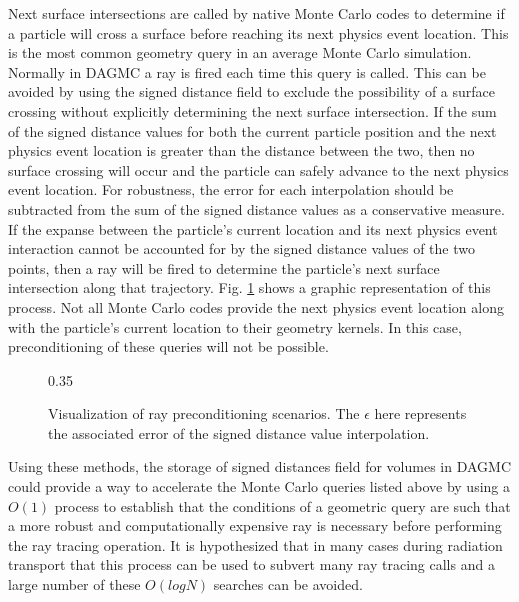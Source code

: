 Next surface intersections are called by native Monte Carlo codes to determine
if a particle will cross a surface before reaching its next physics event
location. This is the most common geometry query in an average Monte Carlo
simulation. Normally in DAGMC a ray is fired each time this query is
called. This can be avoided by using the signed distance field to exclude the
possibility of a surface crossing without explicitly determining the next
surface intersection. If the sum of the signed distance values for both the
current particle position and the next physics event location is greater than
the distance between the two, then no surface crossing will occur and the
particle can safely advance to the next physics event location. For robustness,
the error for each interpolation should be subtracted from the sum of the signed
distance values as a conservative measure. If the expanse between the particle's
current location and its next physics event interaction cannot be accounted for
by the signed distance values of the two points, then a ray will be fired to
determine the particle's next surface intersection along that
trajectory. Fig. \ref{fig:precondition_ray} shows a graphic representation of
this process. Not all Monte Carlo codes provide the next physics event location
along with the particle's current location to their geometry kernels. In this
case, preconditioning of these queries will not be possible.

\begin{figure}[ht]
  \center
  {0.35\textwidth}
  \caption{Visualization of ray preconditioning scenarios. The $\epsilon$ here represents
    the associated error of the signed distance value interpolation.}
  \label{fig:precondition_ray}
\end{figure}

Using these methods, the storage of signed distances field for volumes in DAGMC
could provide a way to accelerate the Monte Carlo queries listed above by using
a $O(1)$ process to establish that the conditions of a geometric query are such
that a more robust and computationally expensive ray is necessary before
performing the ray tracing operation. It is hypothesized that in many cases
during radiation transport that this process can be used to subvert many ray
tracing calls and a large number of these $O(logN)$ searches can be avoided.


